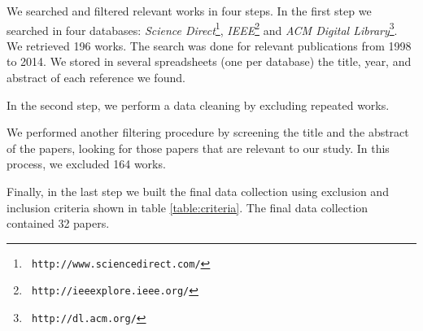 % 

We searched and filtered relevant works in four steps. 
In the first  step we
searched in four databases: \textit{Science Direct}\footnote{\tt
http://www.sciencedirect.com/}, \textit{IEEE}\footnote{\tt
http://ieeexplore.ieee.org/} and \textit{ACM Digital Library}\footnote{\tt
http://dl.acm.org/}. %
We retrieved 196 works. 
The search was done for relevant publications from 1998 to 2014. 
We stored in several spreadsheets (one per database) the title, year,  and abstract of each reference we found. 

In the second step, we perform a data cleaning by excluding repeated works.  

We performed another filtering procedure by screening the title and the abstract
of the papers, looking for those papers that are relevant to our study.
In this process, we excluded 164 works. 

Finally, in the last step we built the final data collection using exclusion
and inclusion criteria shown in table \ref{table:criteria}. The final data
collection contained 32 papers.
 
